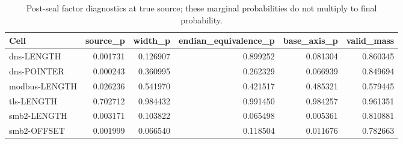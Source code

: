 \begin{table}[t]
\centering
\scriptsize
\caption{Post-seal factor diagnostics at true source; these marginal probabilities do not multiply to final probability.}
\begin{tabular}{lrrrrr}
\toprule
Cell & source\_p & width\_p & endian\_equivalence\_p & base\_axis\_p & valid\_mass \\
\midrule
dns-LENGTH & 0.001731 & 0.126907 & 0.899252 & 0.081304 & 0.860345 \\
dns-POINTER & 0.000243 & 0.360995 & 0.262329 & 0.066939 & 0.849694 \\
modbus-LENGTH & 0.026236 & 0.541970 & 0.421517 & 0.485321 & 0.579445 \\
tls-LENGTH & 0.702712 & 0.984432 & 0.991450 & 0.984257 & 0.961351 \\
smb2-LENGTH & 0.003171 & 0.103822 & 0.065498 & 0.005361 & 0.810881 \\
smb2-OFFSET & 0.001999 & 0.066540 & 0.118504 & 0.011676 & 0.782663 \\
\bottomrule
\end{tabular}
\end{table}
